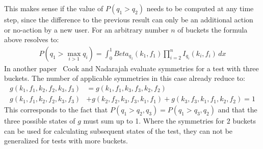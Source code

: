 \documentclass[../Thesis.tex]{subfiles}
\begin{document}
This makes sense if the value of $P(q_1>q_2)$ needs to be computed at any time step, since the difference to the previous result can only be an additional action or no-action by a new user. For an arbitrary number $n$ of buckets the formula above resolves to:
\begin{align*}
P(q_1> \max_{i>1}q_i)=\int_{0}^{1}Beta_{q_1}(k_1,f_1) \prod_{i=2}^{n} I_{q_i}(k_i,f_i)\,dx
\end{align*}
In another paper~\cite{cook2006stochastic} Cook and Nadarajah evaluate symmetries for a test with three buckets. The number of applicable symmetries in this case already reduce to:
\begin{align*}
g(k_1,f_1,k_2,f_2,k_3,f_3) &= g(k_1,f_1,k_3,f_3,k_2,f_2) \\
g(k_1,f_1,k_2,f_2,k_3,f_3) &+ g(k_2,f_2,k_3,f_3,k_1,f_1) + g(k_3,f_3,k_1,f_1,k_2,f_2) = 1
\end{align*}
This corresponds to the fact that $P(q_1>q_2,q_3) = P(q_1>q_3,q_2)$ and that the three possible states of $g$ must sum up to 1. Where the symmetries for $2$ buckets can be used for calculating subsequent states of the test, they can not be generalized for tests with more buckets. 
\end{document}
